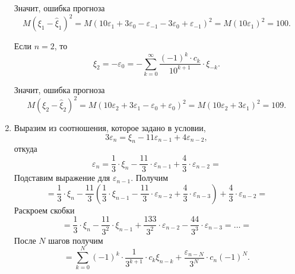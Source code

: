 \begin{enumerate}[label=\alph*)]
  Значит, ошибка прогноза
  \begin{equation*}
    M \left( \xi_1 - \hat{ \xi }_1 \right)^2 =
    M \left(
      10 \varepsilon_1 + 3 \varepsilon_0 - \varepsilon_{-1} - 3 \varepsilon_0 + \varepsilon_{-1}
    \right)^2 =
    M \left( 10 \varepsilon_1 \right)^2 =
    100.
  \end{equation*}

  Если $n = 2$, то
  \begin{equation*}
    \hat{ \xi }_2 = - \varepsilon_0 =
    - \sum \limits_{k = 0}^{ \infty }
      \frac{ \left( -1 \right)^k \cdot c_k}{10^{k + 1}} \cdot \xi_{-k}.
  \end{equation*}

  Значит, ошибка прогноза
  \begin{equation*}
    M \left( \xi_2 - \hat{ \xi }_2 \right)^2 =
    M \left( 10 \varepsilon_2 + 3 \varepsilon_1 - \varepsilon_0 + \varepsilon_0 \right)^2 =
    M \left( 10 \varepsilon_2 + 3 \varepsilon_1 \right)^2 =
    109.
  \end{equation*}
  \item Выразим из соотношения, которое задано в условии,
  \begin{equation*}
    3 \varepsilon_n =
    \xi_n - 11 \varepsilon_{n - 1} + 4 \varepsilon_{n - 2},
  \end{equation*}
  откуда
  \begin{equation*}
    \varepsilon_n =
    \frac{1}{3} \cdot \xi_n - \frac{11}{3} \cdot \varepsilon_{n - 1} +
    \frac{4}{3} \cdot \varepsilon_{n - 2} =
  \end{equation*}
  Подставим выражение для $ \varepsilon_{n - 1}$.
  Получим
  \begin{equation*}
    = \frac{1}{3} \cdot \xi_n - \frac{11}{3} \left(
      \frac{1}{3} \cdot \xi_{n - 1} - \frac{11}{3} \cdot \varepsilon_{n - 2} +
      \frac{4}{3} \cdot \varepsilon_{n - 3}
    \right) + \frac{4}{3} \cdot \varepsilon_{n - 2} =
  \end{equation*}
  Раскроем скобки
  \begin{equation*}
    = \frac{1}{3} \cdot \xi_n - \frac{11}{3^2} \cdot \xi_{n - 1} +
    \frac{133}{3^2} \cdot \varepsilon_{n - 2} - \frac{44}{3^3} \cdot \varepsilon_{n - 3} =
    \dotsc =
  \end{equation*}
  После $N$ шагов получим
  \begin{equation*}
    = \sum \limits_{k = 0}^N \left( -1 \right)^k \cdot \frac{1}{3^{k + 1}} \cdot c_k \xi_{n - k} +
    \frac{ \varepsilon_{n - N}}{3^N} \cdot c_n \left( -1 \right)^N.
  \end{equation*}


\end{enumerate}
